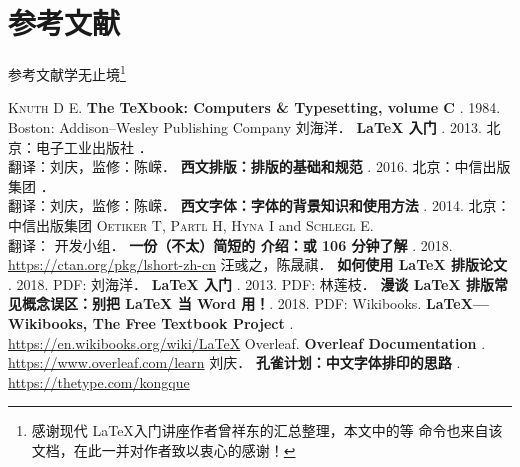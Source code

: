 \documentclass[fontset = none, xcolor=svgnames, t, aspectratio=169]{ctexbeamer}
\begin{document}
\section[参考文献]{参考文献}
\begin{frame}[fragile]{参考文献}{学无止境\footnote[frame,1]{感谢现代
      \LaTeX 入门讲座作者曾祥东的汇总整理，本文中的\texinline[fontsize
      = \zihao{7}]{\link}等
      命令也来自该文档，在此一并对作者致以衷心的感谢！}}
\begin{multicols}{2}
\tiny
\newcommand\BOOK[1]{\textbf{#1}}
\newcommand\TAG[1]{\CASE{[#1]}}
\begin{thebibliography}{99}
  \bibitem{}
    \textsc{Knuth D E}.
    \newblock \BOOK{The \TeX book: Computers \& Typesetting, volume C} \TAG{M}. 1984.
    \newblock Boston: Addison--Wesley Publishing Company
  \bibitem{}
    刘海洋．
    \newblock \BOOK{\LaTeX{} 入门} \TAG{M}. 2013.
    \newblock 北京：电子工业出版社
  \bibitem{}
    ．\\
    翻译：刘庆，监修：陈嵘．
    \newblock \BOOK{西文排版：排版的基础和规范} \TAG{M}. 2016.
    \newblock 北京：中信出版集团
  \bibitem{}
    ．\\
    翻译：刘庆，监修：陈嵘．
    \newblock \BOOK{西文字体：字体的背景知识和使用方法} \TAG{M}. 2014.
    \newblock 北京：中信出版集团
  \bibitem{}
    \textsc{Oetiker T}, \textsc{Partl H}, \textsc{Hyna I} and \textsc{Schlegl E}.\\
    翻译：\CTeX{} 开发小组．
    \newblock \BOOK{一份（不太）简短的 \LaTeXe{} 介绍：或 106 分钟了解 \LaTeXe{}} \TAG{EB/OL}. 2018.
    \newblock \url{https://ctan.org/pkg/lshort-zh-cn}
  \bibitem{}
    汪彧之，陈晟祺．
    \newblock \BOOK{如何使用 \LaTeX{} 排版论文} \TAG{EB/OL}. 2018.
    \newblock PDF:
      \href{https://github.com/tuna/thulib-latex-talk/raw/master/latex-talk.pdf}{\faDownload}
  \bibitem{}
    刘海洋．
    \newblock \BOOK{\LaTeX{} 入门} \TAG{EB/OL}. 2013.
    \newblock PDF:
      \href{https://bbs.pku.edu.cn/attach/e7/f2/e7f2bb698b9c3672/tex_intro_talk.pdf}{\faDownload}
  \bibitem{}
    林莲枝．
    \newblock \BOOK{漫谈 \LaTeX{} 排版常见概念误区：别把 \LaTeX{} 当 Word 用！}\TAG{EB/OL}. 2018.
    \newblock PDF:
      \href{http://static.latexstudio.net/wp-content/uploads/2018/03/LianTze-presentation-0320-forReading.pdf}{\faDownload}
  \bibitem{}
    Wikibooks.
    \newblock \BOOK{\LaTeX{}---Wikibooks, The Free Textbook Project} \TAG{EB/OL}.
    \newblock \url{https://en.wikibooks.org/wiki/LaTeX}
  \bibitem{}
    Overleaf.
    \newblock \BOOK{Overleaf Documentation} \TAG{EB/OL}.
    \newblock \url{https://www.overleaf.com/learn}
  \bibitem{}
    刘庆．
    \newblock \BOOK{孔雀计划：中文字体排印的思路} \TAG{EB/OL}.
    \newblock \url{https://thetype.com/kongque}
\end{thebibliography}
\end{multicols}
\end{frame}
\end{document}
